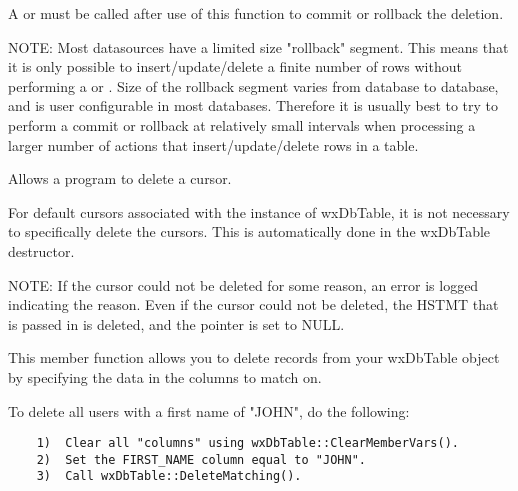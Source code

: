 A  or
 must be called after use of
this function to commit or rollback the deletion.

NOTE: Most datasources have a limited size "rollback" segment.  This means
that it is only possible to insert/update/delete a finite number of rows
without performing a  or
.  Size of the rollback
segment varies from database to database, and is user configurable in
most databases.  Therefore it is usually best to try to perform a commit
or rollback at relatively small intervals when processing a larger number
of actions that insert/update/delete rows in a table.

\label{wxdbtabledeletecursor}


Allows a program to delete a cursor.




For default cursors associated with the instance of wxDbTable, it is not
necessary to specifically delete the cursors.  This is automatically done
in the wxDbTable destructor.

NOTE: If the cursor could not be deleted for some reason, an error is logged
indicating the reason.  Even if the cursor could not be deleted, the HSTMT
that is passed in is deleted, and the pointer is set to NULL.


\label{wxdbtabledeletematching}


This member function allows you to delete records from your wxDbTable object
by specifying the data in the columns to match on.


To delete all users with a first name of "JOHN", do the following:

\begin{verbatim}
    1)  Clear all "columns" using wxDbTable::ClearMemberVars().
    2)  Set the FIRST_NAME column equal to "JOHN".
    3)  Call wxDbTable::DeleteMatching().
\end{verbatim}

